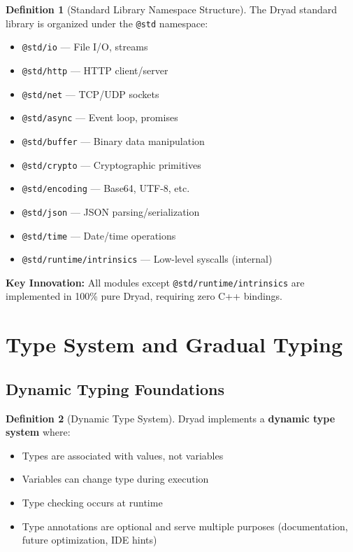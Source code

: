 \documentclass[12pt,a4paper]{article}
\theoremstyle{definition}
\newtheorem{definition}{Definition}[section]
\begin{document}
\begin{definition}[Standard Library Namespace Structure]
The Dryad standard library is organized under the \texttt{@std} namespace:

\begin{itemize}[leftmargin=*]
    \item \texttt{@std/io} — File I/O, streams
    \item \texttt{@std/http} — HTTP client/server
    \item \texttt{@std/net} — TCP/UDP sockets
    \item \texttt{@std/async} — Event loop, promises
    \item \texttt{@std/buffer} — Binary data manipulation
    \item \texttt{@std/crypto} — Cryptographic primitives
    \item \texttt{@std/encoding} — Base64, UTF-8, etc.
    \item \texttt{@std/json} — JSON parsing/serialization
    \item \texttt{@std/time} — Date/time operations
    \item \texttt{@std/runtime/intrinsics} — Low-level syscalls (internal)
\end{itemize}

\textbf{Key Innovation:} All modules except \texttt{@std/runtime/intrinsics} are implemented in 100\% pure Dryad, requiring zero C++ bindings.
\end{definition}

\newpage

\section{Type System and Gradual Typing}

\subsection{Dynamic Typing Foundations}

\begin{definition}[Dynamic Type System]
Dryad implements a \textbf{dynamic type system} where:
\begin{itemize}[leftmargin=*]
    \item Types are associated with values, not variables
    \item Variables can change type during execution
    \item Type checking occurs at runtime
    \item Type annotations are optional and serve multiple purposes (documentation, future optimization, IDE hints)
\end{itemize}
\end{definition}
\end{document}
